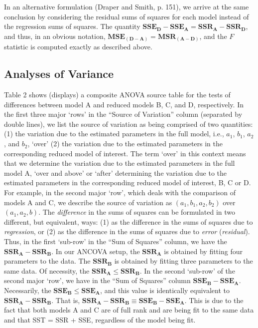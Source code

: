\documentclass[11pt, oneside]{article}   	%
\begin{document}
\vspace{2 mm}

In an alternative formulation (Draper and Smith, p. 151), we arrive at the same conclusion by considering the residual sums of squares for each model instead of the regression sums of squares.  The quantity $ \mathbf{ SSE_{D}} - \mathbf{SSE_{A} }  =   \mathbf{SSR_{A}} -  \mathbf{SSR_{D}}  $, and thus, in an obvious notation, $ \mathbf{ MSE_{(D-A)}}   =  \mathbf{MSR_{(A-D)}} $, and the $  F  $ statistic is computed exactly as described above.
\bigskip
  

\bigskip 
\bigskip

\subsection{Analyses of Variance}
Table 2 shows (displays) a composite ANOVA source table for the tests of differences between model A and reduced models B, C, and D, respectively.  In the first three major `rows' in the ``Source of Variation'' column (separated by double lines), we list the source of variation as being comprised of two quantities: (1) the variation due to the estimated parameters in the full model, i.e., $ a_{1} $, $ b_{1}  $, $  a_{2} $, and $  b_{2} $, `over' (2) the variation due to the estimated parameters in the corresponding reduced model of interest.  The term `over' in this context means that we determine the variation due to the estimated parameters in the full model A, `over and above' or `after' determining the variation due to the estimated parameters in the corresponding reduced model of interest, B, C or D.   For example, in the second major `row', which deals with the comparison of models A and C, we describe the source of variation as $ (a_{1}, b_{1}, a_{2}, b_{2})  $ over $  (a_{1}, a_{2}, b)  $.  The \emph{difference} in the sums of squares can be formulated in two different, but equivalent, ways: (1) as the difference in the sums of squares due to \emph{regression}, or (2) as the difference in the sums of squares due to \emph{error} (\emph{residual}).  Thus, in the first `sub-row' in the ``Sum of Squares'' column, we have the $ \mathbf{SSR_{A}} - \mathbf{SSR_{B}}  $. In our ANCOVA setup, the $ \mathbf{SSR_{A}}  $ is obtained by fitting four parameters to the data.  The  $ \mathbf{SSR_{B}}  $ is obtained by fitting three parameters to the same data.  Of necessity, the  $ \mathbf{SSR_{A}} \leq \mathbf{SSR_{B}}  $.   In the second `sub-row' of the second major `row', we have in the ``Sum of Squares'' column $ \mathbf{SSE_{B}} - \mathbf{SSE_{A}}  $.  Necessarily, the  $ \mathbf{SSE_{B}} \leq \mathbf{SSE_{A}}  $, and this value is identically equivalent to $ \mathbf{SSR_{A}} - \mathbf{SSR_{B}}  $. That is, $ \mathbf{SSR_{A}} - \mathbf{SSR_{B}}  \equiv  \mathbf{SSE_{B}} - \mathbf{SSE_{A}}  $.  This is due to the fact that both models A and C are of full rank and are being fit to the same data and that SST = SSR + SSE, regardless of the model being fit. 
\end{document}
